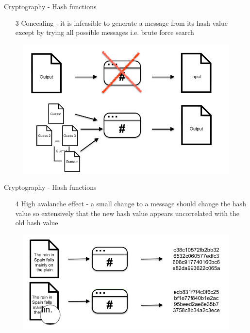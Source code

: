 \documentclass[10pt]{beamer}
\begin{document}

\begin{frame}{Cryptography - Hash functions}
	\begin{enumerate}
		\item[3] Concealing - it is infeasible to generate a message from its hash value except by trying all possible messages i.e. brute force search
	\end{enumerate}
	\begin{figure}[]
		\centering
		\includegraphics  [scale=0.3]{Images/hash3}
		\begin{centering}
		\end{centering}
	\end{figure}
\end{frame}


\begin{frame}{Cryptography - Hash functions}
	\begin{enumerate}
		\item[4] High avalanche effect - a small change to a message should change the hash value so extensively that the new hash value appears uncorrelated with the old hash value
	\end{enumerate}
	\begin{figure}[]
		\centering
		\includegraphics  [scale=0.3]{Images/hash4}
		\begin{centering}
		\end{centering}
	\end{figure}
\end{frame}
\end{document}
